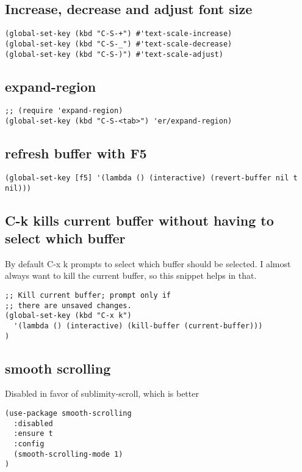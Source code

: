 \documentclass[11pt]{article}
\begin{document}
\subsection*{Increase, decrease and adjust font size}
\label{sec:org5c825a9}

\begin{verbatim}
(global-set-key (kbd "C-S-+") #'text-scale-increase)
(global-set-key (kbd "C-S-_") #'text-scale-decrease)
(global-set-key (kbd "C-S-)") #'text-scale-adjust)
\end{verbatim}

\subsection*{expand-region}
\label{sec:orga39de64}
\begin{verbatim}
;; (require 'expand-region)
(global-set-key (kbd "C-S-<tab>") 'er/expand-region)
\end{verbatim}

\subsection*{refresh buffer with F5}
\label{sec:orgdb294f6}
\begin{verbatim}
(global-set-key [f5] '(lambda () (interactive) (revert-buffer nil t nil)))
\end{verbatim}
\subsection*{C-k kills current buffer without having to select which buffer}
\label{sec:orgf0b9f87}

By default C-x k prompts to select which buffer should be selected.
I almost always want to kill the current buffer, so this snippet helps in that.
\begin{verbatim}
;; Kill current buffer; prompt only if
;; there are unsaved changes.
(global-set-key (kbd "C-x k")
  '(lambda () (interactive) (kill-buffer (current-buffer)))
)
\end{verbatim}

\subsection*{smooth scrolling}
\label{sec:org028a235}

Disabled in favor of sublimity-scroll, which is better
\begin{verbatim}
(use-package smooth-scrolling
  :disabled
  :ensure t
  :config
  (smooth-scrolling-mode 1)
)
\end{verbatim}
\end{document}
